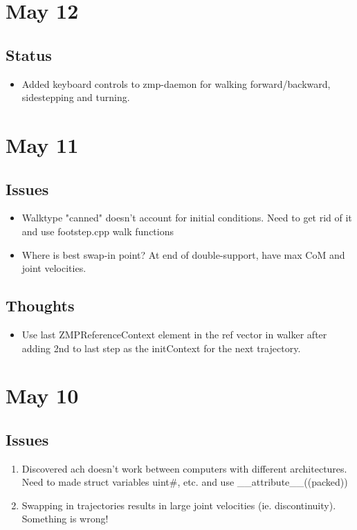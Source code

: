 \documentclass[letterpaper, 10 pt]{report}
\begin{document}
\section*{May 12}
\subsection*{Status}
\begin{itemize}
\item Added keyboard controls to zmp-daemon for walking forward/backward, sidestepping and turning.
\end{itemize}


\section*{May 11}
\subsection*{Issues}
\begin{itemize}
\item Walktype "canned" doesn't account for initial conditions. Need to get rid of it and use footstep.cpp walk functions
\item Where is best swap-in point? At end of double-support, have max CoM and joint velocities.
\end{itemize}
\subsection*{Thoughts}
\begin{itemize}
\item Use last ZMPReferenceContext element in the ref vector in walker after adding 2nd to last step as the initContext for the next trajectory.
\end{itemize}

\section*{May 10}
\subsection*{Issues}
\begin{enumerate}
\item Discovered ach doesn't work between computers with different architectures. Need to made struct variables uint\#, etc. and use \_\_attribute\_\_((packed))
\item Swapping in trajectories results in large joint velocities (ie. discontinuity). Something is wrong!
\end{enumerate}
\end{document}
